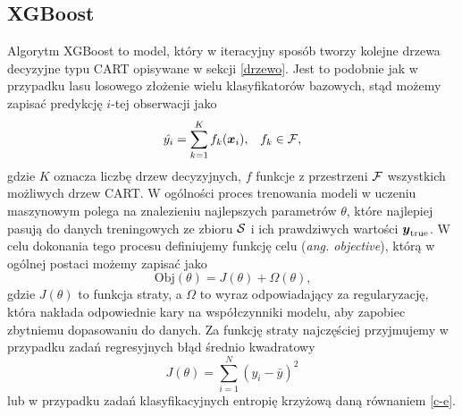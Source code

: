 \documentclass[inzynierska]{pwr_wmat_praca_dyplomowa}
\theoremstyle{plain}
\numberwithin{theorem}{chapter}
\theoremstyle{definition}
\numberwithin{theorem}{chapter}
\begin{document}
\subsection{XGBoost}
Algorytm XGBoost to model, który w iteracyjny sposób tworzy kolejne drzewa decyzyjne typu CART opisywane w sekcji \ref{drzewo}. Jest to podobnie jak w przypadku lasu losowego złożenie wielu klasyfikatorów bazowych, stąd możemy zapisać predykcję $i$-tej obserwacji jako
$$ \hat{y_i} = \sum_{k=1}^K f_k(\boldsymbol{x}_i) \text{,} \quad f_k \in \mathcal{F} \text{,} $$
gdzie $K$ oznacza liczbę drzew decyzyjnych, $f$ funkcje z przestrzeni $\mathcal{F}$ wszystkich możliwych drzew CART.
W ogólności proces trenowania modeli w uczeniu maszynowym polega na znalezieniu najlepszych parametrów $\theta$, które najlepiej pasują do danych treningowych ze zbioru $\mathcal{S}$ i ich prawdziwych wartości $\boldsymbol{y}_{\text{true}}$. W celu dokonania tego procesu definiujemy funkcję celu (\textit{ang. objective}), którą w ogólnej postaci możemy zapisać jako
$$ \text{Obj}(\theta) = J(\theta) + \Omega(\theta) \text{,}$$
gdzie $J(\theta)$ to funkcja straty, a $\Omega$ to wyraz odpowiadający za regularyzację, która nakłada odpowiednie kary na współczynniki modelu, aby zapobiec zbytniemu dopasowaniu do danych. Za funkcję straty najczęściej przyjmujemy w przypadku zadań regresyjnych błąd średnio kwadratowy
$$ J(\theta) = \sum_{i=1}^{N} (y_i - \bar{y})^2 $$
lub w przypadku zadań klasyfikacyjnych entropię krzyżową daną równaniem \ref{c-e}.
\end{document}

